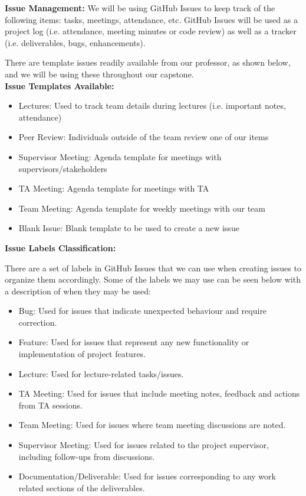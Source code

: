 \documentclass{article}
\begin{document}
\begin{itemize}
\textbf{Issue Management:}
We will be using GitHub Issues to keep track of the following items: tasks, meetings, attendance, etc. GitHub Issues will be used as a project log (i.e. attendance, meeting minutes or code review) as well as a tracker (i.e. deliverables, bugs, enhancements).


There are template issues readily available from our professor, as shown below, and we will be using these throughout our capstone. \\


\textbf{Issue Templates Available:}

\begin{itemize}
  \item Lectures: Used to track team details during lectures (i.e. important notes, attendance)
  \item Peer Review: Individuals outside of the team review one of our items
  \item Supervisor Meeting: Agenda template for meetings with supervisors/stakeholders
  \item TA Meeting: Agenda template for meetings with TA
  \item Team Meeting: Agenda template for weekly meetings with our team
  \item Blank Issue: Blank template to be used to create a new issue \\
\end{itemize}

\textbf{Issue Labels Classification:}

There are a set of labels in GitHub Issues that we can use when creating issues to organize them accordingly. Some of the labels we may use can be seen below with a description of when they may be used:

\begin{itemize}
  \item Bug: Used for issues that indicate unexpected behaviour and require correction.
  \item Feature: Used for issues that represent any new functionality or implementation of project features.
  \item Lecture: Used for lecture-related tasks/issues.
  \item TA Meeting: Used for issues that include meeting notes, feedback and actions from TA sessions.
  \item Team Meeting: Used for issues where team meeting discussions are noted.
  \item Supervisor Meeting: Used for issues related to the project supervisor, including follow-ups from discussions.
  \item Documentation/Deliverable: Used for issues corresponding to any work related sections of the deliverables.
\end{itemize}


\end{itemize}
\end{document}
